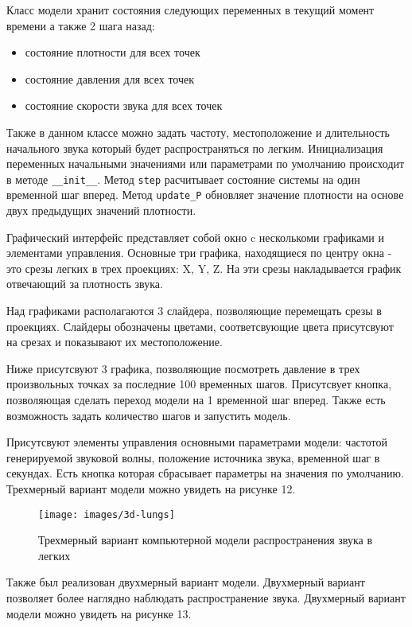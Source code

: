 \documentclass[../main.tex]{subfiles}
\begin{document}
Класс модели хранит состояния следующих переменных в текущий момент времени а также 2 шага назад:

\begin{itemize}
    \item состояние плотности для всех точек
    \item состояние давления для всех точек
    \item состояние скорости звука для всех точек
\end{itemize}

Также в данном классе можно задать частоту, местоположение и длительность начального звука который будет распространяться по легким. Инициализация переменных начальными значениями или параметрами по умолчанию происходит в методе \texttt{\_\_init\_\_}. Метод \texttt{step} расчитывает состояние системы на один временной шаг вперед. Метод \texttt{update\_P} обновляет значение плотности на основе двух предыдущих значений плотности.

Графический интерфейс представляет собой окно c несколькоми графиками и элементами управления. Основные три графика, находящиеся по центру окна - это срезы легких в трех проекциях: X, Y, Z. На эти срезы накладывается график отвечающий за плотность звука. 

Над графиками располагаются 3 слайдера, позволяющие перемещать срезы в проекциях. Слайдеры обозначены цветами, соответсвующие цвета присутсвуют на срезах и показывают их местоположение.

Ниже присутсвуют 3 графика, позволяющие посмотреть давление в трех произвольных точках за последние 100 временных шагов. Присутсвует кнопка, позволяющая сделать переход модели на 1 временной шаг вперед. Также есть возможность задать количество шагов и запустить модель.

Присутсвуют элементы управления основными параметрами модели: частотой генерируемой звуковой волны, положение источника звука, временной шаг в секундах. Есть кнопка которая сбрасывает параметры на значения по умолчанию. Трехмерный вариант модели можно увидеть на рисунке 12.

\begin{figure}[H]
\centering
\texttt{[image: images/3d-lungs]}
\caption{Трехмерный вариант компьютерной модели распространения звука в легких}
\end{figure}


Также был реализован двухмерный вариант модели. Двухмерный вариант позволяет более наглядно наблюдать распространение звука. Двухмерный вариант модели можно увидеть на рисунке 13.
\end{document}
